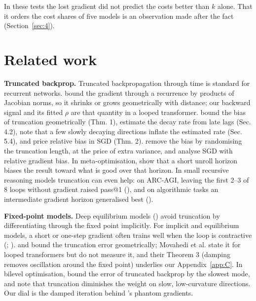 \documentclass[10pt]{article}
\begin{document}
In these tests the lost gradient did not predict the costs better than $k$ alone. That it orders the cost shares of five models is an observation made after the fact (Section~\ref{sec:4}).

\section{Related work}\label{sec:7}

\textbf{Truncated backprop.} Truncated backpropagation through time is standard for recurrent networks. \citet{pascanu2013} bound the gradient through a recurrence by products of Jacobian norms, so it shrinks or grows geometrically with distance; our backward signal and its fitted $\rho$ are that quantity in a looped transformer. \citet{aicher2019} bound the bias of truncation geometrically (Thm. 1), estimate the decay rate from late lags (Sec. 4.2), note that a few slowly decaying directions inflate the estimated rate (Sec. 5.4), and price relative bias in SGD (Thm. 2). \citet{tallec2017} remove the bias by randomising the truncation length, at the price of extra variance, and \citet{ajalloeian2020} analyse SGD with relative gradient bias. In meta-optimisation, \citet{wu2018shorthorizon} show that a short unroll horizon biases the result toward what is good over that horizon. In small recursive reasoning models truncation can even help: on ARC-AGI, leaving the first 2--3 of 8 loops without gradient raised pass@1 (\citealp[Table 3]{gao2025urm}), and on algorithmic tasks an intermediate gradient horizon generalised best (\citealp[Table 8]{shakhvalieva2026}).

\textbf{Fixed-point models.} Deep equilibrium models (\citealp{bai2019deq}) avoid truncation by differentiating through the fixed point implicitly. For implicit and equilibrium models, a short or one-step gradient often trains well when the loop is contractive (\citealp{fung2022}; \citealp{geng2021}). \citet[Prop.~3]{liao2018} and \citet[Prop.~1]{movahedi2026fprm} bound the truncation error geometrically; Movahedi et al. state it for looped transformers but do not measure it, and their Theorem 3 (damping removes oscillation around the fixed point) underlies our Appendix~\ref{app:C}. In bilevel optimisation, \citet{shaban2019} bound the error of truncated backprop by the slowest mode, and \citet{vicol2022} note that truncation diminishes the weight on slow, low-curvature directions. Our dial is the damped iteration behind \citeauthor{geng2021}'s phantom gradients.
\end{document}
